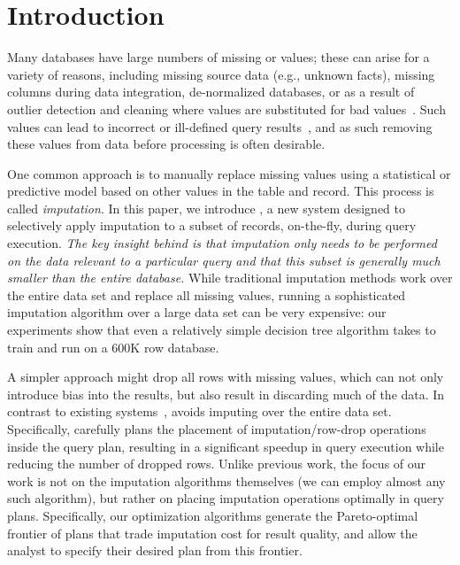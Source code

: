 \section{Introduction}

Many databases have large numbers of missing or \nullv{} values;  these can arise for a variety of reasons, including missing source data (e.g., unknown facts),
missing columns during data integration, de-normalized databases, or as a result of outlier detection and cleaning where \nullv{} values are substituted for
bad values~\cite{kim2003}.  Such \nullv{} values can lead to incorrect or ill-defined query results~\cite{rubin1976}, and as such removing these values from data
before processing is often desirable.

One common approach is to manually replace missing values using a statistical or predictive model based on other values in the table and record.
This process is called \emph{imputation}.
In this paper, we introduce \ProjectName{}, a new system designed to selectively apply imputation to a subset of records, on-the-fly, during query execution.  \emph{The key insight behind \ProjectName{} is that imputation
only needs to be performed on the data relevant to a particular query and
that this subset is generally much smaller than the entire database.}  
While traditional imputation methods work over the entire data set and replace all missing
values, running a sophisticated imputation algorithm over a large data set can be very
expensive: our experiments show that even a relatively simple decision tree algorithm takes \acsbaseresulthours{} to train and run
on a 600K row database.

A simpler approach might drop all rows with missing values, which can not only introduce
bias into the results, but also result in discarding much of the data.
In contrast to existing systems~\cite{burgette2010multiple,akande2015empirical}, \ProjectName{} avoids imputing over the entire data set. Specifically, \ProjectName{}
carefully plans the placement of imputation/row-drop operations inside the query plan, resulting in a 
significant speedup in query execution while reducing the number of dropped rows. Unlike previous work, the focus of our work is not on the imputation algorithms themselves (we can employ almost any such algorithm), but rather on placing imputation operations
optimally in query plans.   Specifically, our optimization algorithms generate the
Pareto-optimal frontier of plans that trade imputation cost for result quality,
and allow the analyst to specify their desired plan from this frontier.

